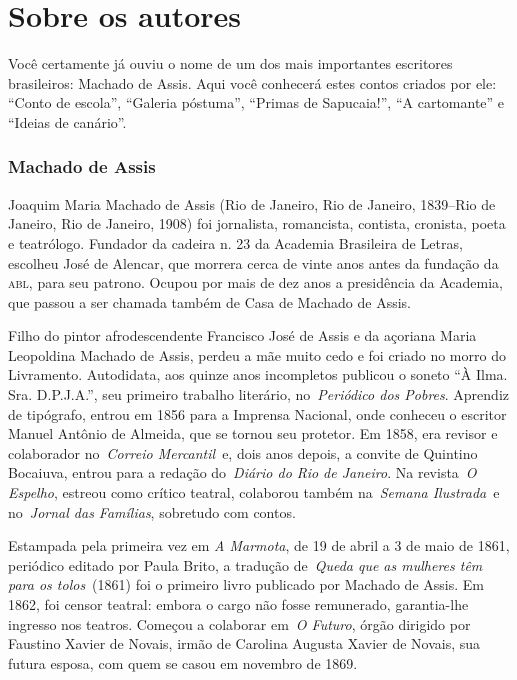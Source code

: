 \chapter{Sobre os autores} %

Você certamente já ouviu o nome de um dos mais importantes
escritores brasileiros: Machado de Assis. Aqui você conhecerá estes
contos criados por ele: ``Conto de escola'', ``Galeria póstuma'',
``Primas de Sapucaia!'', ``A cartomante'' e ``Ideias de canário''.

\subsection{Machado de Assis}

Joaquim Maria Machado de Assis (Rio de Janeiro, Rio de Janeiro,
1839--Rio de Janeiro, Rio de Janeiro, 1908) foi jornalista, romancista,
contista, cronista, poeta e teatrólogo. Fundador da cadeira n. 23 da
Academia Brasileira de Letras, escolheu José de Alencar, que morrera
cerca de vinte anos antes da fundação da \textsc{abl}, para seu patrono. Ocupou
por mais de dez anos a presidência da Academia, que passou a ser chamada
também de Casa de Machado de Assis.

Filho do pintor afrodescendente Francisco José de Assis e da açoriana
Maria Leopoldina Machado de Assis, perdeu a mãe muito cedo e foi criado
no morro do Livramento. Autodidata, aos quinze anos incompletos publicou
o soneto ``À Ilma. Sra. D.P.J.A.'', seu primeiro trabalho literário,
no~\emph{Periódico dos Pobres}. Aprendiz de tipógrafo, entrou em 1856
para a Imprensa Nacional, onde conheceu o escritor Manuel Antônio de
Almeida, que se tornou seu protetor. Em 1858, era revisor e colaborador
no~\emph{Correio Mercantil}~e, dois anos depois, a convite de Quintino
Bocaiuva, entrou para a redação do~\emph{Diário do Rio de Janeiro}. Na
revista~\emph{O Espelho}, estreou como crítico teatral, colaborou também
na~\emph{Semana Ilustrada}~e no~\emph{Jornal das Famílias}, sobretudo
com contos.

Estampada pela primeira vez em \emph{A Marmota}, de 19 de abril a 3 de
maio de 1861, periódico editado por Paula Brito, a tradução
de~\emph{Queda que as mulheres têm para os tolos}~(1861) foi o primeiro
livro publicado por Machado de Assis. Em 1862, foi censor teatral:
embora o cargo não fosse remunerado, garantia-lhe ingresso nos teatros.
Começou a colaborar em~\emph{O Futuro}, órgão dirigido por Faustino
Xavier de Novais, irmão de Carolina Augusta Xavier de Novais, sua futura
esposa, com quem se casou em novembro de 1869.

